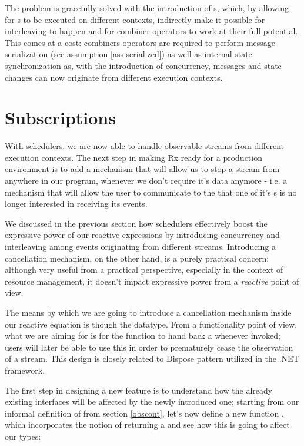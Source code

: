 The problem is gracefully solved with the introduction of s, which, by allowing for s to be executed on different contexts, indirectly make it possible for interleaving to happen and for combiner operators to work at their full potential. This comes at a cost: combiners operators are required to perform message serialization (see assumption \ref{ass-serialized}) as well as internal state synchronization as, with the introduction of concurrency, messages and state changes can now originate from different execution contexts.

\section{Subscriptions}
\label{sec:subscriptions}

With schedulers, we are now able to handle observable streams from different execution contexts. The next step in making Rx ready for a production environment is to add a mechanism that will allow us to stop a stream from anywhere in our program, whenever we don't require it's data anymore - i.e. a mechanism that will allow the user to communicate to the  that one of it's s is no longer interested in receiving its events. 

We discussed in the previous section how schedulers effectively boost the expressive power of our reactive expressions by introducing concurrency and interleaving among events originating from different streams. Introducing a cancellation mechanism, on the other hand, is a purely practical concern: although very useful from a practical perspective, especially in the context of resource management, it doesn't impact expressive power from a \textit{reactive} point of view.

The means by which we are going to introduce a cancellation mechanism inside our reactive equation is though the  datatype. From a functionality point of view, what we are aiming for is for the  function to hand back a  whenever invoked; users will later be able to use this  in order to prematurely cease the observation of a stream. This design is closely related to Dispose pattern utilized in the .NET framework\cite{cwalina2008framework}.

The first step in designing a new feature is to understand how the already existing interfaces will be affected by the newly introduced one; starting from our informal definition of  from section \ref{obscont}, let's now define a new function \code{(\%)}, which incorporates the notion of returning a  and see how this is going to affect our types:

